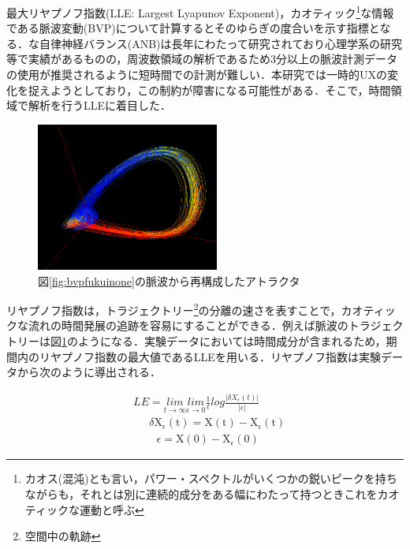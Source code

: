 最大リヤプノフ指数(LLE: Largest Lyapunov Exponent)，カオティック\footnote{カオス(混沌)とも言い，パワー・スペクトルがいくつかの鋭いピークを持ちながらも，それとは別に連続的成分をある幅にわたって持つときこれをカオティックな運動と呼ぶ\cite{berje}}な情報である脈波変動(BVP)について計算するとそのゆらぎの度合いを示す指標となる\cite{oyama2012}．な自律神経バランス(ANB)は長年にわたって研究されており心理学系の研究等で実績があるものの，周波数領域の解析であるため3分以上の脈波計測データの使用が推奨されるように短時間での計測が難しい．本研究では一時的UX\cite{uxwhitepaper}の変化を捉えようとしており，この制約が障害になる可能性がある．そこで，時間領域で解析を行うLLEに着目した．

\begin{figure}[htbp]
    \begin{center}
       \includegraphics[width=60mm]{img/atr_fukui_none.png}
    \end{center}
    \caption{図\ref{fig:bvpfukuinone}の脈波から再構成したアトラクタ}
    \label{fig:atrfukuinone}
\end{figure}

リヤプノフ指数は，トラジェクトリー\footnote{空間中の軌跡}の分離の速さを表すことで，カオティックな流れの時間発展の追跡を容易にすることができる\cite{berje}．例えば脈波のトラジェクトリーは図\ref{fig:atrfukuinone}のようになる．実験データにおいては時間成分が含まれるため，期間内のリヤプノフ指数の最大値であるLLEを用いる．リヤプノフ指数は実験データから次のように導出される\cite{hu}．


\begin{align*}
&LE= \underset{t\rightarrow\infty}{lim} \underset{\epsilon\rightarrow 0}{lim}\frac{1}{t}log\frac{\vert \delta X_{\epsilon}(t)\vert}{\vert \epsilon\vert} \tag{2}\\ 
& \quad\ \ \delta\mathrm{X}_{\epsilon}(\mathrm{t})=\mathrm{X}(\mathrm{t})-\mathrm{X}_{\epsilon}(\mathrm{t}) \tag{3}\\ 
& \quad\ \ \ \ \ \epsilon=\mathrm{X}(0)-\mathrm{X}_{\epsilon}(0) \tag{4} 
\end{align*}


